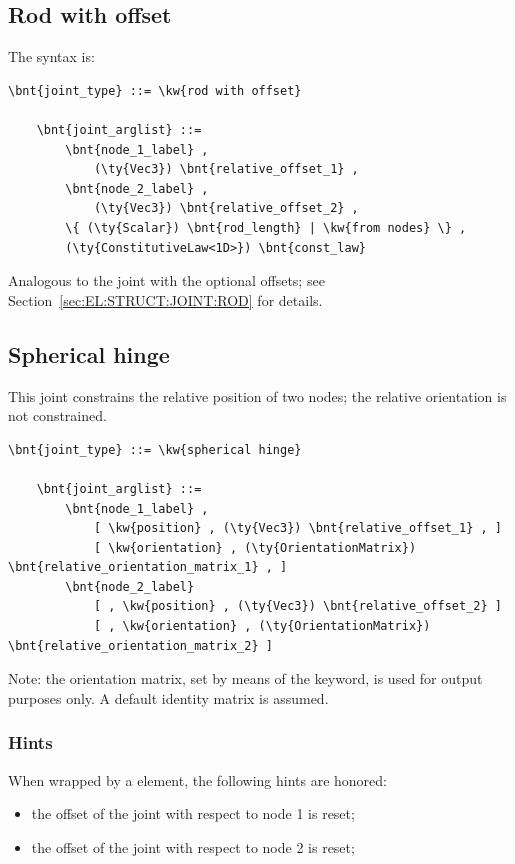 \subsection{Rod with offset}
\label{sec:EL:STRUCT:JOINT:ROD_WITH_OFFSET}
The syntax is:
\begin{Verbatim}[commandchars=\\\{\}]
    \bnt{joint_type} ::= \kw{rod with offset}

    \bnt{joint_arglist} ::=
        \bnt{node_1_label} ,
            (\ty{Vec3}) \bnt{relative_offset_1} ,
        \bnt{node_2_label} ,
            (\ty{Vec3}) \bnt{relative_offset_2} ,
        \{ (\ty{Scalar}) \bnt{rod_length} | \kw{from nodes} \} ,
        (\ty{ConstitutiveLaw<1D>}) \bnt{const_law}
\end{Verbatim}
Analogous to the  joint with the optional offsets;
see Section~\ref{sec:EL:STRUCT:JOINT:ROD} for details.



\subsection{Spherical hinge}
\label{sec:EL:STRUCT:JOINT:SPHERICAL_HINGE}
This joint constrains the relative position of two nodes;
the relative orientation is not constrained.
\begin{Verbatim}[commandchars=\\\{\}]
    \bnt{joint_type} ::= \kw{spherical hinge}

    \bnt{joint_arglist} ::= 
        \bnt{node_1_label} ,
            [ \kw{position} , (\ty{Vec3}) \bnt{relative_offset_1} , ]
            [ \kw{orientation} , (\ty{OrientationMatrix}) \bnt{relative_orientation_matrix_1} , ]
        \bnt{node_2_label}
            [ , \kw{position} , (\ty{Vec3}) \bnt{relative_offset_2} ]
            [ , \kw{orientation} , (\ty{OrientationMatrix}) \bnt{relative_orientation_matrix_2} ]
\end{Verbatim}
Note: the orientation matrix, set by means of the  keyword,
is used for output purposes only. 
A default identity matrix is assumed.

\subsubsection{Hints}
When wrapped by a  element, the following hints are honored:
\begin{itemize}
\item {} the offset of the joint
with respect to node 1 is reset;
\item {} the offset of the joint
with respect to node 2 is reset;
\end{itemize}


